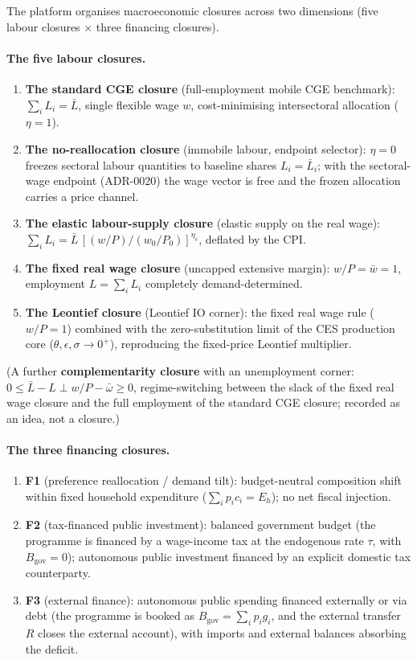 The platform organises macroeconomic closures across two dimensions (five
labour closures $\times$ three financing closures).

\paragraph{The five labour closures.}
\begin{enumerate}
\item \textbf{The standard CGE closure} (full-employment mobile CGE benchmark):
  $\sum_i L_i = \bar L$, single flexible wage $w$, cost-minimising
  intersectoral allocation ($\eta = 1$).
\item \textbf{The no-reallocation closure} (immobile labour, endpoint
  selector): $\eta = 0$ freezes
  sectoral labour quantities to baseline shares $L_i = \bar L_i$; with the
  sectoral-wage endpoint (ADR-0020) the wage vector is free and the frozen
  allocation carries a price channel.
\item \textbf{The elastic labour-supply closure} (elastic supply on the real
  wage):
  $\sum_i L_i = \bar L\,[(w/P)/(w_0/P_0)]^{\eta_s}$, deflated by the CPI.
\item \textbf{The fixed real wage closure} (uncapped extensive margin):
  $w/P = \bar w = 1$, employment $L = \sum_i L_i$ completely
  demand-determined.
\item \textbf{The Leontief closure} (Leontief IO corner): the fixed real
  wage rule ($w/P = 1$) combined with
  the zero-substitution limit of the CES production core
  ($\theta, \epsilon, \sigma \to 0^+$), reproducing the fixed-price Leontief
  multiplier.
\end{enumerate}
(A further \textbf{complementarity closure} with an unemployment corner: $0 \le
\bar L - L \perp w/P -
\bar\omega \ge 0$, regime-switching between the slack of the fixed real
wage closure and the full employment of the standard CGE closure; recorded
as an idea, not a closure.)

\paragraph{The three financing closures.}
\begin{enumerate}
\item \textbf{F1} (preference reallocation / demand tilt): budget-neutral
  composition shift within fixed household expenditure
  ($\sum_i p_i c_i = E_h$); no net fiscal injection.
\item \textbf{F2} (tax-financed public investment): balanced government
  budget (the programme is financed by a wage-income tax at the endogenous
  rate $\tau$, with $B_{\mathrm{gov}}=0$); autonomous public investment
  financed by an explicit domestic tax counterparty.
\item \textbf{F3} (external finance): autonomous public
  spending financed externally or via debt (the programme is booked as
  $B_{\mathrm{gov}}=\sum_i p_i g_i$, and the external transfer $R$ closes the
  external account), with imports and external balances absorbing the deficit.
\end{enumerate}

